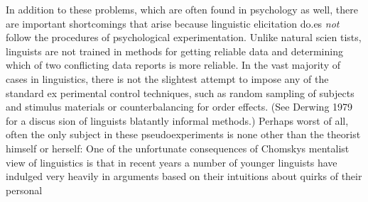 \begin{styleTextbody}
In addition to these problems, which are often found in psychology as well, there are important shortcomings that arise because linguistic elicitation do.es \textit{not}\textit{ }follow the procedures of psychological experimentation. Unlike natural scien\- tists, linguists are not trained in methods for getting reliable data and determining which of two conflicting data reports is more reliable. In the vast majority of cases in linguistics, there is not the slightest attempt to impose any of the standard ex\- perimental control techniques, such as random sampling of subjects and stimulus materials or counterbalancing for order effects. (See Derwing 1979 for a discus\- sion of linguists{\textquotesingle} {\textquotedbl}blatantly informal{\textquotedbl} methods.) Perhaps worst of all, often the only subject in these pseudoexperiments is none other than the theorist himself or herself: {\textquotedbl}One of the unfortunate consequences of Chomsky{\textquotesingle}s mentalist view of linguistics is that in recent years a number of younger linguists have indulged very heavily in arguments based on their intuitions about quirks of their personal
\end{styleTextbody}


